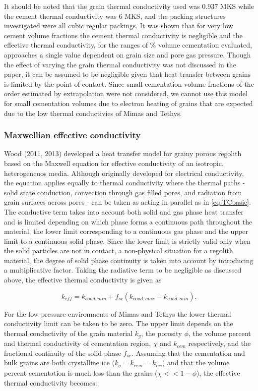 \documentclass[11pt]{article} %
\begin{document}
	It should be noted that the grain thermal conductivity used was 0.937 MKS while the cement thermal conductivity was 6 MKS, and the packing structures investigated were all cubic regular packings. It was shown that for very low cement volume fractions the cement thermal conductivity is negligible and the effective thermal conductivity, for the ranges of \% volume cementation evaluated, approaches a single value dependent on grain size and pore gas pressure. Though the effect of varying the grain thermal conductivity was not discussed in the paper, it can be assumed to be negligible given that heat transfer between grains is limited by the point of contact. Since small cementation volume fractions of the order estimated by extrapolation were not considered, we cannot use this model for small cementation volumes due to electron heating of grains that are expected due to the low thermal conductivies of Mimas and Tethys.

\subsubsection{Maxwellian effective conductivity}
	 Wood (2011, 2013) developed a heat transfer model for grainy porous regolith based on the Maxwell equation for effective conductivity of an isotropic, heterogeneuos media. Although originally developed for electrical conductivity, the equation applies equally to thermal conductivity where the thermal paths - solid state conduction, convection through gas filled pores, and radiation from grain surfaces across pores - can be taken as acting in parallel as in \ref{eq:TCbasic}. The conductive term takes into account both solid and gas phase heat transfer and is limited depending on which phase forms a continuous path throughout the material, the lower limit corresponding to a continuous gas phase and the upper limit to a continuous solid phase. Since the lower limit is strictly valid only when the solid particles are not in contact, a non-physical situation for a regolith material, the degree of solid phase continuity is taken into account by introducing a multiplicative factor. Taking the radiative term to be negligible as discussed above, the effective thermal conductivity is given as
	
	\begin{equation}
	k_{eff} = k_{cond,min} +f_{sc}(k_{cond,max}-k_{cond,min}).
	\end{equation}
	
	For the low pressure environments of Mimas and Tethys the lower thermal conductivity limit can be taken to be zero. The upper limit depends on the thermal conductivity of the grain material $ k_{g}$, the porosity $\phi$, the volume percent and thermal conductivity of cementation region, $\chi$ and $k_{cem}$ respectively, and the fractional continuity of the solid phase $f_{sc}$. Assuming that the cementation and bulk grains are both crystalline ice ($k_{g} = k_{cem} = k_{ice}$) and that the volume percent cementation is much less than the grains ($\chi << 1-\phi$), the effective thermal conductivity becomes:	
	
\end{document}
